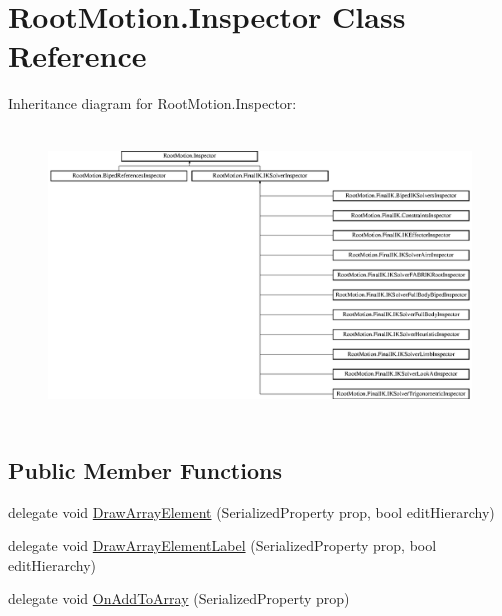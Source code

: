 \hypertarget{class_root_motion_1_1_inspector}{}\section{Root\+Motion.\+Inspector Class Reference}
\label{class_root_motion_1_1_inspector}
Inheritance diagram for Root\+Motion.\+Inspector\+:\begin{figure}[H]
\begin{center}
\leavevmode
\includegraphics[height=7.777778cm]{class_root_motion_1_1_inspector}
\end{center}
\end{figure}
\subsection*{Public Member Functions}
\begin{DoxyCompactItemize}
\item 
delegate void \mbox{\hyperlink{class_root_motion_1_1_inspector_a369c57a74b02e7f38059b2bb5e7ef36c}{Draw\+Array\+Element}} (Serialized\+Property prop, bool edit\+Hierarchy)
\item 
delegate void \mbox{\hyperlink{class_root_motion_1_1_inspector_aa060038e590bda971023ece8f2945330}{Draw\+Array\+Element\+Label}} (Serialized\+Property prop, bool edit\+Hierarchy)
\item 
delegate void \mbox{\hyperlink{class_root_motion_1_1_inspector_a0d030b75017c7036643fb9d039ed39d7}{On\+Add\+To\+Array}} (Serialized\+Property prop)
\end{DoxyCompactItemize}
